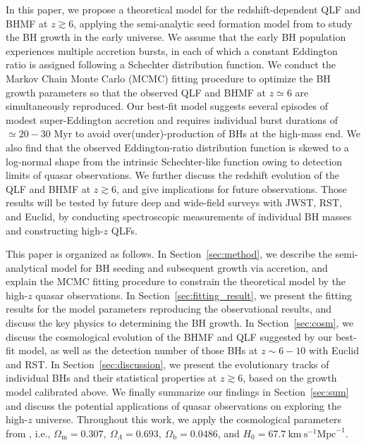 \documentclass[twocolumn, twocolappendix]{aastex63}
\begin{document}
\begin{CJK*}{UTF8}{gbsn}
In this paper, we propose a theoretical model for the redshift-dependent QLF and BHMF at $z\gtrsim 6$,
applying the semi-analytic seed formation model from \cite{2021ApJ...917...60L} to study the BH growth in the early universe.
We assume that the early BH population experiences multiple accretion bursts, in each of which a constant Eddington ratio is assigned 
following a Schechter distribution function. 
We conduct the Markov Chain Monte Carlo (MCMC) fitting procedure to optimize the BH growth parameters 
so that the observed QLF and BHMF at $z\simeq 6$ are simultaneously reproduced. 
Our best-fit model suggests several episodes of modest super-Eddington accretion and requires
individual burst durations of $\simeq 20-30$ Myr to avoid over(under)-production of BHs at the high-mass end.
We also find that the observed Eddington-ratio distribution function is skewed to a log-normal shape from the intrinsic Schechter-like function
owing to detection limits of quasar observations.
We further discuss the redshift evolution of the QLF and BHMF at $z\gtrsim 6$,
and give implications for future observations.
Those results will be tested by future deep and wide-field surveys with JWST, RST, and Euclid,
by conducting spectroscopic measurements of individual BH masses and constructing high-$z$ QLFs.  



This paper is organized as follows. 
In Section~\ref{sec:method}, we describe the semi-analytical model for BH seeding and subsequent growth via accretion,
and explain the MCMC fitting procedure to constrain the theoretical model by the high-$z$ quasar observations.
In Section~\ref{sec:fitting_result}, we present the fitting results for the model parameters reproducing the observational results,
and discuss the key physics to determining the BH growth.
In Section~\ref{sec:cosm}, we discuss the cosmological evolution of the BHMF and QLF suggested by our best-fit model,
as well as the detection number of those BHs at $z\sim 6-10$ with Euclid and RST.
In Section~\ref{sec:discussion}, we present the evolutionary tracks of individual BHs and their statistical properties at $z\gtrsim 6$,
based on the growth model calibrated above.
We finally summarize our findings in Section~\ref{sec:sum} and discuss the potential applications of quasar observations on 
exploring the high-$z$ universe.
Throughout this work, we apply the cosmological parameters from \cite{2016A&A...594A..13P},
i.e., $\Omega_{\mathrm{m}}=0.307,~\Omega_{\Lambda}=0.693,~
\Omega_{\mathrm{b}}=0.0486$, and $H_0=67.7 \mathrm{~km} \mathrm{~s}^{-1} \mathrm{Mpc}^{-1}$.





\end{CJK*}
\end{document}
